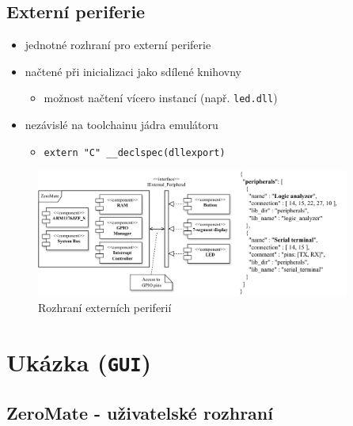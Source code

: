 \documentclass[compress]{beamer}
\begin{document}
\subsection{Externí periferie}

\begin{frame}
	
	\begin{itemize}
		\item jednotné rozhraní pro externí periferie
		\item načtené při inicializaci jako sdílené knihovny
		\begin{itemize}
			\item možnost načtení vícero instancí (např. \texttt{led.dll})
		\end{itemize}
		\item nezávislé na toolchainu jádra emulátoru
		\begin{itemize}
			\item \texttt{extern "C" \_\_declspec(dllexport)}
		\end{itemize}
	\end{itemize}
	\vspace{-0.4cm}
	\begin{figure}
		\centering
		\hspace{0.4cm}
		\vspace{-0.4cm}
		\includegraphics[width=0.92\textwidth]{img/peripheral_interface_2.pdf}
		\caption{Rozhraní externích periferií}
	\end{figure}
\end{frame}

\section{Ukázka (\texttt{GUI})}

\subsection{ZeroMate - uživatelské rozhraní}
\end{document}
